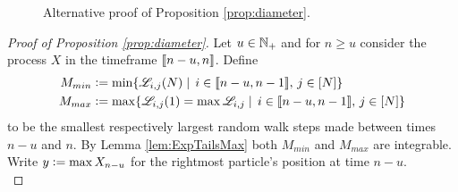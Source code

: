 \begin{figure}[!h]
\begin{minipage}{0.45\textwidth}
  \caption{Alternative proof of Proposition \ref{prop:diameter}. }
  \label{fig:diam_alternative_proof}
\end{minipage}
\end{figure}


\begin{proof}[Proof of Proposition \ref{prop:diameter}]
Let $u \in \mathbb{N}_+$ and for $n \geq u$ consider the process $X$ in the timeframe $\llbracket n - u, n\rrbracket$. Define 
\begin{align*}
M_{min} &\vcentcolon= \min\{ \mathscr{L}_{i, j}(N) \mid\, i \in \llbracket n-u, n-1\rrbracket,\, j \in [N]\} \\
M_{max} &\vcentcolon= \max\{ \mathscr{L}_{i, j}(1) = \max\mathscr{L}_{i,j} \mid\, i \in \llbracket n-u, n-1\rrbracket,\, j \in [N]\}
\end{align*} 
to be the smallest respectively largest random walk steps made between times $n-u$ and $n$. By Lemma \ref{lem:ExpTailsMax} both $M_{min}$ and $M_{max}$ are integrable. Write $y \vcentcolon= \max X_{n - u}$ for the rightmost particle's position at time $n-u$. \\


\end{proof}
